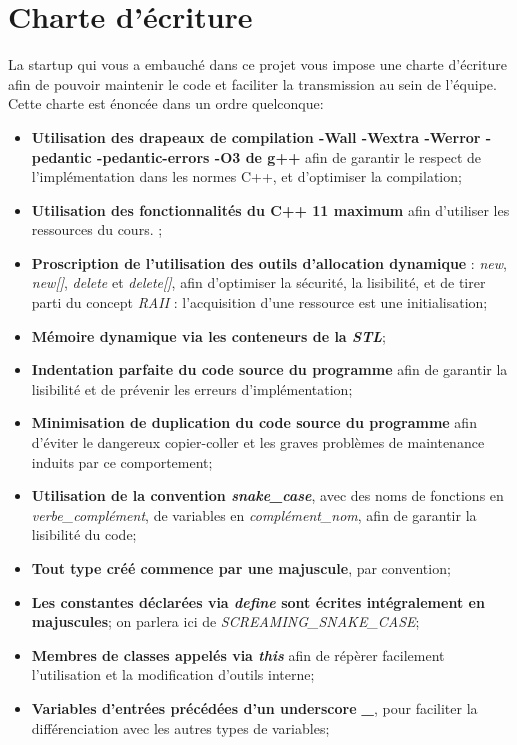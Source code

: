 \documentclass[9pts]{article}
\begin{document}
\section{Charte d'écriture}
\label{sec::charte}
La startup qui vous a embauché dans ce projet vous impose une charte d'écriture afin de pouvoir maintenir le code et faciliter la transmission au sein de l'équipe. Cette charte est énoncée dans un ordre quelconque:\\

\begin{itemize}
\item \textbf{Utilisation des drapeaux de compilation -Wall -Wextra -Werror -pedantic -pedantic-errors -O3 de g++} afin de garantir le respect de l'implémentation dans les normes C++, et d'optimiser la compilation;
\item \textbf{Utilisation des fonctionnalités du C++ 11 maximum} afin d'utiliser les ressources du cours. ; %
\item \textbf{Proscription de l'utilisation des outils d'allocation dynamique} : \emph{new}, \emph{new[]}, \emph{delete} et \emph{delete[]}, afin d'optimiser la sécurité, la lisibilité, et de tirer parti du concept \emph{RAII} : l'acquisition d'une ressource est une initialisation;
\item \textbf{Mémoire dynamique via les conteneurs de la \emph{STL}};
\item \textbf{Indentation parfaite du code source du programme} afin de garantir la lisibilité et de prévenir les erreurs d'implémentation;
\item \textbf{Minimisation de duplication du code source du programme} afin d'éviter le dangereux copier-coller et les graves problèmes de maintenance induits par ce comportement;
\item \textbf{Utilisation de la convention \emph{snake\_case}}, avec des noms de fonctions en \emph{verbe\_complément}, de variables en \emph{complément\_nom}, afin de garantir la lisibilité du code;
\item \textbf{Tout type créé commence par une majuscule}, par convention;
\item \textbf{Les constantes déclarées via \emph{define} sont écrites intégralement en majuscules}; on parlera ici de \emph{SCREAMING\_SNAKE\_CASE};
\item \textbf{Membres de classes appelés via \emph{this}} afin de répèrer facilement l'utilisation et la modification d'outils interne;
\item \textbf{Variables d'entrées précédées d'un underscore \emph{\_}}, pour faciliter la différenciation avec les autres types de variables;

\end{itemize}
\end{document}
